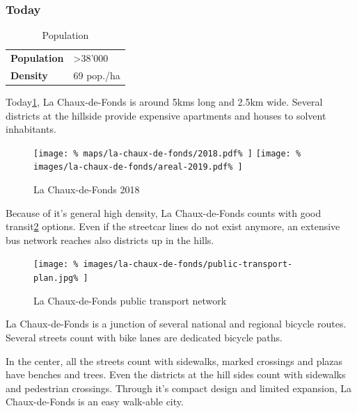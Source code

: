 \documentclass[twocolumn]{article}
\begin{document}
			
			\subsubsection{Today}			
			
			\begin{table}[H]			
				\centering
				\caption{Population}
				\label{table:la-chaux-de-fonds-population}
				\begin{tabular}{|l|l|}
					\hline
					\textbf{Population}  & \textgreater 38'000 \\
					\textbf{Density}     & 69 pop./ha \\
					\hline
				\end{tabular}
			\end{table}
			
			Today\ref{fig:map:la-chaux-de-fonds-2018}, La Chaux-de-Fonds is around 5kms long and 2.5km wide. Several districts at the hillside provide expensive apartments and houses to solvent inhabitants.
			
			\begin{figure}[H]
				\texttt{[image: \%
					maps/la-chaux-de-fonds/2018.pdf\%
				]}
				\texttt{[image: \%
					images/la-chaux-de-fonds/areal-2019.pdf\%
				]}
				\caption{La Chaux-de-Fonds 2018\cite{MapGeoAdmin:LaChauxDeFonds}}
				\label{fig:map:la-chaux-de-fonds-2018}
			\end{figure}
			
			Because of it's general high density, La Chaux-de-Fonds counts with good transit\ref{fig:la-chaux-de-fonds-public-transport} options. Even if the streetcar lines do not exist anymore, an extensive bus network reaches also districts up in the hills.
			
			
			
			\begin{figure}[H]
				\texttt{[image: \%
					images/la-chaux-de-fonds/public-transport-plan.jpg\%
				]}
				\caption{La Chaux-de-Fonds public transport network\cite{TransN:LaChauxDeFonds}}
				\label{fig:la-chaux-de-fonds-public-transport}
			\end{figure}
			
			La Chaux-de-Fonds is a junction of several national and regional bicycle routes. Several streets count with bike lanes are dedicated bicycle paths.
			
			In the center, all the streets count with sidewalks, marked crossings and plazas have benches and trees. Even the districts at the hill sides count with sidewalks and pedestrian crossings.
			Through it's compact design and limited expansion, La Chaux-de-Fonds is an easy walk-able city.
			
\end{document}
